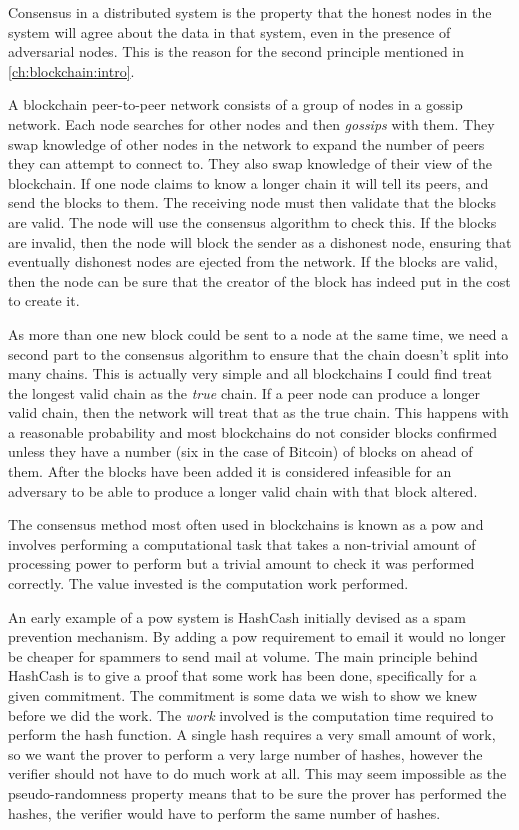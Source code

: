 Consensus in a distributed system is the property that the honest nodes in the system will agree about the data in that system, even in the presence of adversarial nodes. This is the reason for the second principle mentioned in \autoref{ch:blockchain:intro}.

A blockchain peer-to-peer network consists of a group of nodes in a gossip network. Each node searches for other nodes and then \emph{gossips} with them. They swap knowledge of other nodes in the network to expand the number of peers they can attempt to connect to. They also swap knowledge of their view of the blockchain. If one node claims to know a longer chain it will tell its peers, and send the blocks to them. The receiving node must then validate that the blocks are valid. The node will use the consensus algorithm to check this. If the blocks are invalid, then the node will block the sender as a dishonest node, ensuring that eventually dishonest nodes are ejected from the network. If the blocks are valid, then the node can be sure that the creator of the block has indeed put in the cost to create it.

As more than one new block could be sent to a node at the same time, we need a second part to the consensus algorithm to ensure that the chain doesn't split into many chains. This is actually very simple and all blockchains I could find treat the longest valid chain as the \emph{true} chain. If a peer node can produce a longer valid chain, then the network will treat that as the true chain. This happens with a reasonable probability and most blockchains do not consider blocks confirmed unless they have a number (six in the case of Bitcoin) of blocks on ahead of them. After the blocks have been added it is considered infeasible for an adversary to be able to produce a longer valid chain with that block altered.

The consensus method most often used in blockchains is known as a \gls{pow} and involves performing a computational task that takes a non-trivial amount of processing power to perform but a trivial amount to check it was performed correctly. The value invested is the computation work performed.

An early example of a \gls{pow} system is HashCash \cite{backHashcashDenialService2002} initially devised as a spam prevention mechanism. By adding a \gls{pow} requirement to email it would no longer be cheaper for spammers to send mail at volume. The main principle behind HashCash is to give a proof that some work has been done, specifically for a given commitment. The commitment is some data we wish to show we knew before we did the work. The \emph{work} involved is the computation time required to perform the hash function. A single hash requires a very small amount of work, so we want the prover to perform a very large number of hashes, however the verifier should not have to do much work at all. This may seem impossible as the pseudo-randomness property means that to be sure the prover has performed the hashes, the verifier would have to perform the same number of hashes.

